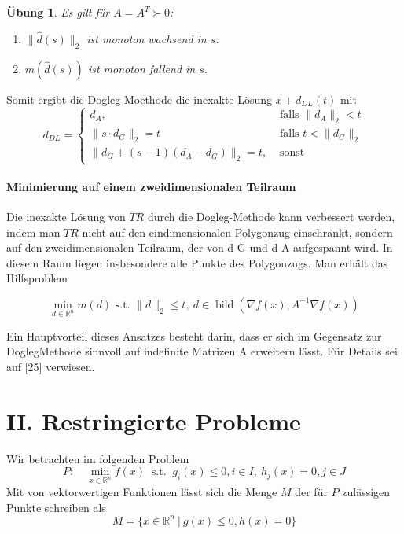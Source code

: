 \documentclass[11pt]{scrreprt}
\newcounter{thm}
\theoremstyle{thmstyle}
\numberwithin{thm}{section}
\newtheorem{uebung}[thm]{Übung}
\begin{document}
\begin{uebung}
	Es gilt für $A = A^T \succ 0$:
	\begin{enumerate}[label=\alph*\upshape)]
		\item $\|\hat{d}(s)\|_2$ ist monoton wachsend in $s$.
		\item $m(\hat{d}(s))$ ist monoton fallend in $s$.
	\end{enumerate}
\end{uebung}

Somit ergibt die Dogleg-Moethode die inexakte Lösung $x + d_{DL}(t)$ mit
$$ d_{DL} = \begin{cases}
 d_A, & \text{ falls } \| d_A \|_2 < t \\ \| s \cdot d_G \|_2 = t & \text{ falls } t < \| d_G \|_2 \\ \| d_G + (s - 1) (d_A - d_G) \|_2= t, & \text{ sonst}	
 \end{cases}
 $$
 
 \subsubsection*{Minimierung auf einem zweidimensionalen Teilraum}

Die inexakte Lösung von $TR$ durch die Dogleg-Methode kann verbessert werden, indem man $TR$ nicht auf den eindimensionalen Polygonzug einschränkt, sondern auf den zweidimensionalen Teilraum, der von d G und d A aufgespannt wird. In diesem Raum liegen insbesondere alle Punkte des Polygonzugs. Man erhält das Hilfsproblem

$$ \min_{d \in \mathbb{R}^n} m(d) \text{ s.t. } \| d \|_2 \leq t, ~ d \in \operatorname{bild}(\nabla f(x), A^{-1} \nabla f(x)) $$

Ein Hauptvorteil dieses Ansatzes besteht darin, dass er sich im Gegensatz zur DoglegMethode sinnvoll auf indefinite Matrizen A erweitern lässt. Für Details sei auf [25] verwiesen.

\chapter*{II. Restringierte Probleme}

\setcounter{chapter}{3}
\setcounter{section}{1}
\setcounter{thm}{1}

Wir betrachten im folgenden Problem
$$ P: \quad \min_{x \in \mathbb{R}^n} f(x) ~\text{ s.t. }~ g_i(x) \leq 0, i \in I, ~ h_j(x) = 0, j \in J $$
Mit von vektorwertigen Funktionen lässt sich die Menge $M$ der für $P$ zulässigen Punkte schreiben als
$$ M = \big\{ x \in \mathbb{R}^n ~|~ g(x) \leq 0, h(x) = 0 \big\} $$
\end{document}
